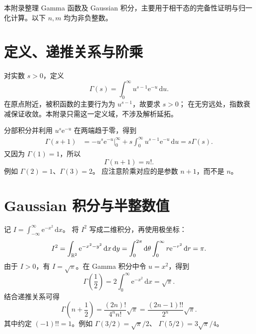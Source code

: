 \label{app:gamma}
本附录整理 Gamma 函数及 Gaussian 积分，主要用于相干态的完备性证明与归一化计算。以下 $n,m$ 均为非负整数。

\section{定义、递推关系与阶乘}
对实数 $s>0$，定义
\begin{equation}
\Gamma\left(s\right)=\int_0^\infty u^{s-1}\mathrm{e}^{-u}\,\mathrm{d}u.
\label{eq:app-gamma-definition}
\end{equation}
在原点附近，被积函数的主要行为为 $u^{s-1}$，故要求 $s>0$；
在无穷远处，指数衰减保证收敛。本附录只需这一定义域，不涉及解析延拓。

分部积分并利用 $u^s\mathrm{e}^{-u}$ 在两端趋于零，得到
\begin{align}
\Gamma\left(s+1\right)
&=\left.-u^s\mathrm{e}^{-u}\right|_0^\infty
+s\int_0^\infty u^{s-1}\mathrm{e}^{-u}\,\mathrm{d}u
=s\Gamma\left(s\right).
\end{align}
又因为 $\Gamma\left(1\right)=1$，所以
\begin{equation}
\boxed{\Gamma\left(n+1\right)=n!.}
\label{eq:app-gamma-factorial}
\end{equation}
例如 $\Gamma\left(2\right)=1$、$\Gamma\left(3\right)=2$。
应注意阶乘对应的是参数 $n+1$，而不是 $n$。

\section{Gaussian 积分与半整数值}
记 $I=\int_{-\infty}^{\infty}\mathrm{e}^{-x^2}\,\mathrm{d}x$。
将 $I^2$ 写成二维积分，再使用极坐标：
\begin{equation}
I^2=\int_{\mathbb{R}^2}\mathrm{e}^{-x^2-y^2}\,\mathrm{d}x\,\mathrm{d}y
=\int_0^{2\pi}\mathrm{d}\theta\int_0^\infty r\mathrm{e}^{-r^2}\,\mathrm{d}r
=\pi.
\end{equation}
由于 $I>0$，有 $I=\sqrt\pi$。在 Gamma 积分中令 $u=x^2$，得到
\begin{equation}
\Gamma\left(\frac12\right)
=2\int_0^\infty\mathrm{e}^{-x^2}\,\mathrm{d}x=\sqrt\pi.
\end{equation}
结合递推关系可得
\begin{equation}
\boxed{\Gamma\left(n+\frac12\right)
=\frac{\left(2n\right)!}{4^n n!}\sqrt\pi
=\frac{\left(2n-1\right)!!}{2^n}\sqrt\pi.}
\end{equation}
其中约定 $\left(-1\right)!!=1$。例如
$\Gamma\left(3/2\right)=\sqrt\pi/2$、
$\Gamma\left(5/2\right)=3\sqrt\pi/4$。

